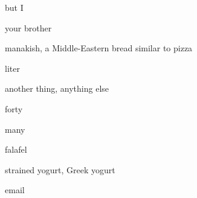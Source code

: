 \begin{flashcard}{\LARGE but I}
\LARGE {}
\end{flashcard}
\begin{flashcard}{\LARGE your brother}
\LARGE {}
\end{flashcard}
\begin{flashcard}{\LARGE manakish, a Middle-Eastern bread similar to pizza}
\LARGE {}
\end{flashcard}
\begin{flashcard}{\LARGE liter}
\LARGE {}
\end{flashcard}
\begin{flashcard}{\LARGE another thing, anything else}
\LARGE {}
\end{flashcard}
\begin{flashcard}{\LARGE forty}
\LARGE {}
\end{flashcard}
\begin{flashcard}{\LARGE many}
\LARGE {}
\end{flashcard}
\begin{flashcard}{\LARGE falafel}
\LARGE {}
\end{flashcard}
\begin{flashcard}{\LARGE strained yogurt, Greek yogurt}
\LARGE {}
\end{flashcard}
\begin{flashcard}{\LARGE email}
\LARGE {}
\end{flashcard}

